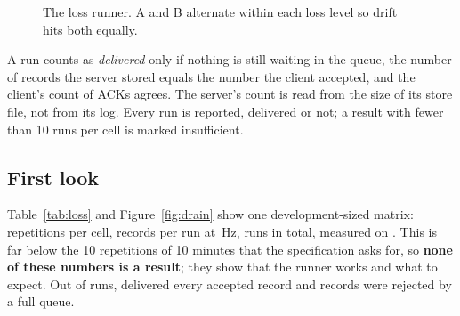 \documentclass[11pt,a4paper]{article}
\newcommand{\prog}[1]{\texttt{#1}}
\begin{document}
\begin{figure}[!tbp]
\centering
{}
\caption{The loss runner. A and B alternate within each loss level so drift hits both equally.}
\label{fig:lossrig}
\end{figure}

A run counts as \emph{delivered} only if nothing is still waiting in the queue, the number of
records the server stored equals the number the client accepted, and the client's count of ACKs
agrees. The server's count is read from the size of its store file, not from its log. Every run is
reported, delivered or not; a result with fewer than 10 runs per cell is marked insufficient.

\subsection{First look}

Table~\ref{tab:loss} and Figure~\ref{fig:drain} show one development-sized matrix: \EightPerCell{}
repetitions per cell, \EightRecords{} records per run at \EightRate{}\,Hz, \EightRuns{} runs in total,
measured on \EightDate{}. This is far below the 10 repetitions of 10 minutes that the specification asks
for, so \textbf{none of these numbers is a result}; they show that the runner works and what to expect.
Out of \EightRuns{} runs, \EightDelivered{} delivered every accepted record and \EightRejected{}
records were rejected by a full queue.
\end{document}
